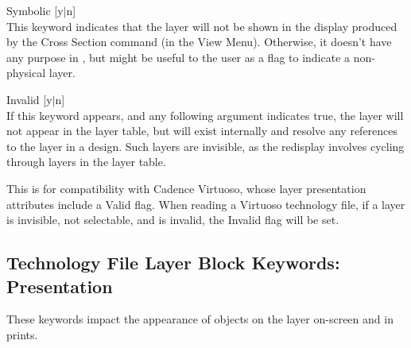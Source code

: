 \begin{description}
\item{\vt Symbolic} [{\vt y}$|${\vt n}]\\
This keyword indicates that the layer will not be shown in the display
produced by the {\cb Cross Section} command (in the {\cb View Menu}). 
Otherwise, it doesn't have any purpose in {\Xic}, but might be useful
to the user as a flag to indicate a non-physical layer.

\item{\vt Invalid} [{\vt y}$|${\vt n}]\\
If this keyword appears, and any following argument indicates true,
the layer will not appear in the layer table, but will exist
internally and resolve any references to the layer in a design.  Such
layers are invisible, as the redisplay involves cycling through layers
in the layer table.

This is for compatibility with Cadence Virtuoso, whose layer
presentation attributes include a {\vt Valid} flag.  When reading a
Virtuoso technology file, if a layer is invisible, not selectable, and
is invalid, the {\Xic} {\vt Invalid} flag will be set.
\end{description}


\subsection{Technology File Layer Block Keywords:  Presentation}

These keywords impact the appearance of objects on the layer on-screen
and in prints.

